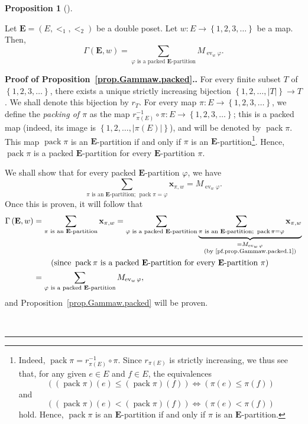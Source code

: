 \documentclass[numbers=enddot,12pt,final,onecolumn,notitlepage,abstracton]{scrartcl}%
\theoremstyle{definition}
\newtheorem{prop}[theo]{Proposition}
\newenvironment{proposition}[1][]
{\begin{prop}[#1]\begin{leftbar}}
{\end{leftbar}\end{prop}}
\newenvironment{proof}[1][Proof]{\noindent\textbf{#1.} }{\ \rule{0.5em}{0.5em}}
\let\sumnonlimits\sum
\renewcommand{\sum}{\sumnonlimits\limits}
\newcommand{\xx}{{\mathbf{x}}}
\newcommand{\ev}{\operatorname{ev}}
\newcommand{\pack}{\operatorname{pack}}
\newcommand{\EE}{{\mathbf{E}}}
\begin{document}
\begin{proposition}
\label{prop.Gammaw.packed}
Let $\EE = \left(E, <_1, <_2\right)$ be a double poset. Let
$w : E \to \left\{1, 2, 3, \ldots\right\}$ be a map.
Then,
\begin{equation}
\label{eq.prop.Gammaw.packed}
\Gamma\left(\EE , w\right)
= \sum_{\varphi \text{ is a packed } \EE\text{-partition}}
M_{\ev_w \varphi} .
\end{equation}
\end{proposition}

\begin{proof}[Proof of Proposition~\ref{prop.Gammaw.packed}.]
For every finite subset $T$ of
$\left\{1, 2, 3, \ldots\right\}$, there exists a unique strictly
increasing bijection $\left\{1, 2, \ldots,
\left|T\right|\right\} \to T$. We shall denote this bijection by
$r_T$.
For every map $\pi : E \to \left\{1, 2, 3, \ldots\right\}$, we
define the \textit{packing of $\pi$} as the map
$r_{\pi\left(E\right)}^{-1} \circ \pi : E \to
\left\{1, 2, 3, \ldots\right\}$; this is a packed map (indeed,
its image is
$\left\{1, 2, \ldots, \left|\pi\left(E\right)\right|\right\}$),
and will be
denoted by $\pack \pi$. This map $\pack \pi$ is an $\EE$-partition
if and only if $\pi$ is an $\EE$-partition\footnote{Indeed,
$\pack \pi = r_{\pi\left(E\right)}^{-1} \circ \pi$. Since
$r_{\pi\left(E\right)}$ is strictly increasing, we thus see that,
for any given $e \in E$ and $f \in E$, the equivalences
\[
\left(\left(\pack \pi\right)\left(e\right)
      \leq \left(\pack \pi\right)\left(f\right)\right)
\Longleftrightarrow
\left( \pi\left(e\right) \leq \pi\left(f\right) \right)
\]
and
\[
\left(\left(\pack \pi\right)\left(e\right)
      < \left(\pack \pi\right)\left(f\right)\right)
\Longleftrightarrow
\left( \pi\left(e\right) < \pi\left(f\right) \right)
\]
hold. Hence, $\pack \pi$ is an $\EE$-partition
if and only if $\pi$ is an $\EE$-partition.}.
Hence, $\pack \pi$ is a packed $\EE$-partition for every
$\EE$-partition $\pi$.

We shall show that for every packed $\EE$-partition $\varphi$, we
have
\begin{equation}
\sum_{\pi\text{ is an }\EE\text{-partition; } \pack \pi = \varphi}
\xx_{\pi, w} = M_{\ev_w \varphi} .
\label{pf.prop.Gammaw.packed.1}
\end{equation}
Once this is proven, it will follow that
\begin{align*}
\Gamma\left(\EE , w\right)
&= \sum_{\pi\text{ is an }\EE\text{-partition}}
  \xx_{\pi, w}
= \sum_{\varphi \text{ is a packed } \EE\text{-partition}}
  \underbrace{\sum_{\pi\text{ is an }\EE\text{-partition; } \pack \pi = \varphi}
              \xx_{\pi, w}}_{\substack{ = M_{\ev_w \varphi} \\
                             \text{(by \eqref{pf.prop.Gammaw.packed.1})}
                             }} \\
& \qquad \left(\text{since } \pack \pi \text{ is a packed }
             \EE\text{-partition for every }
             \EE\text{-partition } \pi\right) \\
&= \sum_{\varphi \text{ is a packed } \EE\text{-partition}}
M_{\ev_w \varphi} ,
\end{align*}
and Proposition~\ref{prop.Gammaw.packed} will be proven.


\end{proof}
\end{document}
